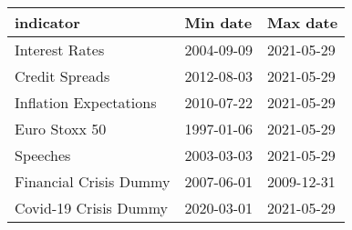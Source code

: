 \begin{table}
\centering
\begin{tabular}[t]{lll}
\toprule
indicator & Min date & Max date\\
\midrule
Interest Rates & 2004-09-09 & 2021-05-29\\
Credit Spreads & 2012-08-03 & 2021-05-29\\
Inflation Expectations & 2010-07-22 & 2021-05-29\\
Euro Stoxx 50 & 1997-01-06 & 2021-05-29\\
Speeches & 2003-03-03 & 2021-05-29\\
\addlinespace
Financial Crisis Dummy & 2007-06-01 & 2009-12-31\\
Covid-19 Crisis Dummy  & 2020-03-01 & 2021-05-29\\
\bottomrule
\end{tabular}
\end{table}

